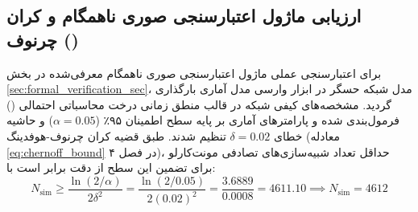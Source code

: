 \documentclass[oneside,openany,phd]{TMU-Thesis}
\begin{document}
\begin{table}[htbp]
\centering
\caption{تحلیل تجربی حساسیت روند یادگیری عامل نسبت به تغییرات ضریب شکل‌دهی $\rho$}
\label{tab:rho_sensitivity}
\end{table}

\subsection{ارزیابی ماژول اعتبارسنجی صوری ناهمگام  و کران چرنوف ()}
\label{subsec:uppaal_smc_eval}

برای اعتبارسنجی عملی ماژول اعتبارسنجی صوری ناهمگام معرفی‌شده در بخش \ref{sec:formal_verification_sec}، مدل شبکه حسگر  در ابزار وارسی مدل آماری  بارگذاری گردید. مشخصه‌های کیفی شبکه در قالب منطق زمانی درخت محاسباتی احتمالی () فرمول‌بندی شده و پارامترهای آماری بر پایه سطح اطمینان ۹۵٪ ($\alpha = 0.05$) و حاشیه خطای $\delta = 0.02$ تنظیم شدند. طبق قضیه کران چرنوف-هوفدینگ (معادله \ref{eq:chernoff_bound} در فصل ۴)، حداقل تعداد شبیه‌سازی‌های تصادفی مونت‌کارلو برای تضمین این سطح از دقت برابر است با:
\begin{equation}
\label{eq:chernoff_eval_bound}
N_{\text{sim}} \ge \frac{\ln(2/\alpha)}{2\delta^2} = \frac{\ln(2/0.05)}{2(0.02)^2} = \frac{3.6889}{0.0008} = 4611.10 \implies N_{\text{sim}} = 4612
\end{equation}
\end{document}
